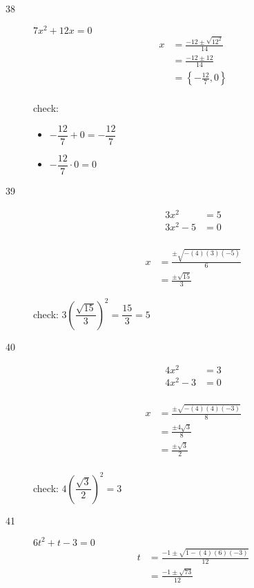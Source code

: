 \documentclass[fleqn,addpoints]{exam}
\begin{document}
\begin{description}
\item[38] \( 7x^2+12x = 0 \)
\begin{align*}
  x &= \frac{-12 \pm \sqrt{12^2}}{14} \\
  &= \frac{-12 \pm 12}{14} \\
  &= \left \{ - \frac{12}{7}, 0 \right \} \\
\end{align*}

check:
\begin{itemize}
  \item \( - \dfrac{12}{7} + 0 = - \dfrac{12}{7} \)
  \item \( - \dfrac{12}{7} \cdot 0 = 0 \)
\end{itemize}


\item[39] 
\begin{align*}
  3x^2 &= 5 \\
  3x^2 - 5 &= 0 \\
\end{align*}

\begin{align*}
  x &= \frac{\pm \sqrt{- (4)(3)(-5)}}{6} \\
  &= \frac{\pm \sqrt{15}}{3}
\end{align*}

check: \( 3 \left( \dfrac{\sqrt{15}}{3} \right)^2 = \dfrac{15}{3} = 5 \)

\item[40]
\begin{align*}
  4x^2 &= 3 \\
  4x^2 - 3 &= 0 \\
\end{align*}

\begin{align*}
  x &= \frac{\pm \sqrt{- (4)(4)(-3)}}{8} \\
  &= \frac{\pm 4 \sqrt{3}}{8} \\
  &= \frac{\pm \sqrt{3}}{2} \\
\end{align*}

check: \( 4 \left( \dfrac{\sqrt{3}}{2} \right)^2 = 3 \)

\item[41] \( 6t^2 + t - 3 = 0 \)
\begin{align*}
  t &= \frac{-1 \pm \sqrt{1 - (4)(6)(-3)}}{12} \\
  &= \frac{-1 \pm \sqrt{73}}{12} \\
\end{align*}


\end{description}
\end{document}
